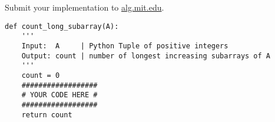 \documentclass[12pt,twoside]{article}
\begin{document}
\begin{problems}
\vfill
\problem  %
Submit your implementation to {\small\url{alg.mit.edu}}.

\begin{lstlisting}
def count_long_subarray(A):
    '''
    Input:  A     | Python Tuple of positive integers
    Output: count | number of longest increasing subarrays of A
    '''
    count = 0
    ##################
    # YOUR CODE HERE #
    ##################
    return count
\end{lstlisting}

\end{problems}
\end{document}
